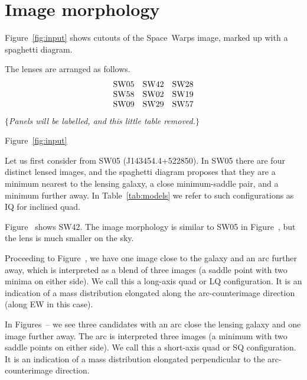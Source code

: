 \section{Image morphology}

Figure~\ref{fig:input} shows cutouts of the Space~Warps image, marked
up with a spaghetti diagram.

The lenses are arranged as follows.
$$
\begin{matrix}
\rm SW05 & \rm SW42 & \rm SW28 \\
\rm SW58 & \rm SW02 & \rm SW19 \\
\rm SW09 & \rm SW29 & \rm SW57
\end{matrix}
$$ 
$\{${\em Panels will be labelled, and this little table removed.}$\}$

Figure~\ref{fig:input}

Let us first consider from SW05 (J143454.4+522850).
In SW05 there are four distinct lensed images, and the spaghetti
diagram proposes that they are a minimum nearest to the lensing
galaxy, a close minimum-saddle pair, and a minimum further away. In
Table~\ref{tab:models} we refer to such configurations as IQ for
inclined quad.

Figure~ shows SW42.  The image morphology is similar to
SW05 in Figure~, but the lens is much smaller on the sky.

Proceeding to Figure~, we have one image close to the
galaxy and an arc further away, which is interpreted as a blend of
three images (a saddle point with two minima on either side).  We call
this a long-axis quad or LQ configuration.  It is an indication of a
mass distribution elongated along the arc-counterimage direction
(along EW in this case).

In Figures~-- we see three candidates with
an arc close the lensing galaxy and one image further away.  The arc
is interpreted three images (a minimum with two saddle points on
either side).  We call this a short-axis quad or SQ configuration.  It
is an indication of a mass distribution elongated perpendicular to the
arc-counterimage direction.



\begin{figure*}
\label{fig:input}
\caption{Marked-up images.}
\end{figure*}


